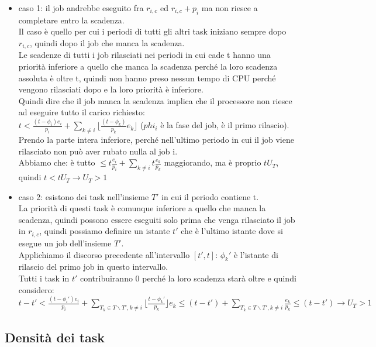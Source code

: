 \documentclass[12pt, oneside]{extbook}
\begin{document}
\begin{itemize}
	\item caso 1: il job andrebbe eseguito fra $r_{i,c}$ ed $r_{i,c} + p_i$ ma non riesce a completare entro la scadenza.\\
	Il caso è quello per cui i periodi di tutti gli altri task iniziano sempre dopo $r_{i,c}$, quindi dopo il job che manca la scadenza.\\
	Le scadenze di tutti i job rilasciati nei periodi in cui cade t hanno una priorità inferiore a quello che manca la scadenza perché la loro scadenza assoluta è oltre t, quindi non hanno preso nessun tempo di CPU perché vengono rilasciati dopo e la loro priorità è inferiore.\\
	Quindi dire che il job manca la scadenza implica che il processore non riesce ad eseguire tutto il carico richiesto:\\
	$t < \frac{(t - \phi_i) e_i}{p_i} + \sum_{k \neq i} \lfloor \frac{(t - \phi_k)}{p_k} e_k \rfloor$ ($phi_i$ è la fase del job, è il primo rilascio). Prendo la parte intera inferiore, perché nell'ultimo periodo in cui il job viene rilasciato non può aver rubato nulla al job i.\\Abbiamo che:
	è tutto $\leq t \frac{e_i}{p_i} + \sum_{k \neq i} t \frac{e_k}{p_k}$ maggiorando, ma è proprio $tU_T$, quindi $t < t U_T \rightarrow U_T > 1$
	\item caso 2: esistono dei task nell'insieme $T'$ in cui il periodo contiene t.\\
	La priorità di questi task è comunque inferiore a quello che manca la scadenza, quindi possono essere eseguiti solo prima che venga rilasciato il job in $r_{i,c}$, quindi possiamo definire un istante $t'$ che è l'ultimo istante dove si esegue un job dell'insieme $T'$.\\
	Applichiamo il discorso precedente all'intervallo $[t', t]$: $\phi_k'$ è l'istante di rilascio del primo job in questo intervallo.\\
	Tutti i task in $t'$ contribuiranno 0 perché la loro scadenza starà  oltre e quindi considero:\\
	$t - t' < \frac{(t - \phi_i') e_i}{p_i} + \sum_{T_k \in T\backslash T', k\neq i} \lfloor \frac{t - \phi_k'}{p_k} \rfloor e_k \leq (t-t') + \sum_{T_k \in T\backslash T', k\neq i} \frac{e_k}{p_k} \leq (t-t') \rightarrow U_T > 1$
\end{itemize}

\subsection{Densità dei task}
\end{document}
